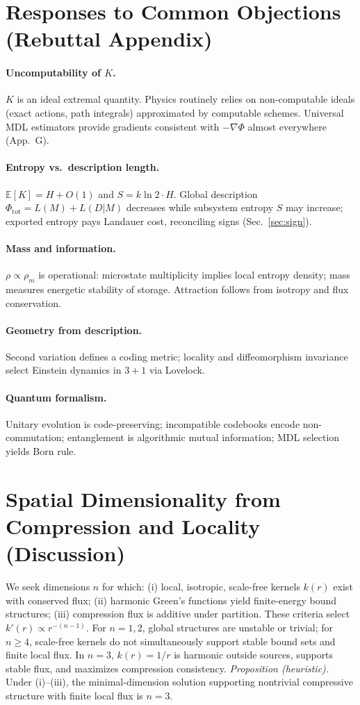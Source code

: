 \documentclass[aps,preprint,onecolumn,longbibliography,nofootinbib]{revtex4-2}
\numberwithin{equation}{section}
\begin{document}
\section{Responses to Common Objections (Rebuttal Appendix)}\label{app:E}
\paragraph*{Uncomputability of $K$.}
$K$ is an ideal extremal quantity. Physics routinely relies on non-computable ideals (exact actions, path integrals) approximated by computable schemes. Universal MDL estimators provide gradients consistent with $-\nabla\Phi$ almost everywhere (App.~G).

\paragraph*{Entropy vs.\ description length.}
$\mathbb{E}[K]=H+O(1)$ and $S=k\ln2\cdot H$. Global description $\Phi_{\text{tot}}=L(M)+L(D|M)$ decreases while subsystem entropy $S$ may increase; exported entropy pays Landauer cost, reconciling signs (Sec.~\ref{sec:sign}).

\paragraph*{Mass and information.}
$\rho\propto\rho_m$ is operational: microstate multiplicity implies local entropy density; mass measures energetic stability of storage. Attraction follows from isotropy and flux conservation.

\paragraph*{Geometry from description.}
Second variation defines a coding metric; locality and diffeomorphism invariance select Einstein dynamics in $3{+}1$ via Lovelock.

\paragraph*{Quantum formalism.}
Unitary evolution is code-preserving; incompatible codebooks encode non-commutation; entanglement is algorithmic mutual information; MDL selection yields Born rule.

\section{Spatial Dimensionality from Compression and Locality (Discussion)}\label{app:F}
We seek dimensions $n$ for which: (i) local, isotropic, scale-free kernels $k(r)$ exist with conserved flux; (ii) harmonic Green’s functions yield finite-energy bound structures; (iii) compression flux is additive under partition. These criteria select $k'(r)\propto r^{-(n-1)}$. For $n=1,2$, global structures are unstable or trivial; for $n\ge 4$, scale-free kernels do not simultaneously support stable bound sets and finite local flux. In $n=3$, $k(r)=1/r$ is harmonic outside sources, supports stable flux, and maximizes compression consistency. \emph{Proposition (heuristic).} Under (i)–(iii), the minimal-dimension solution supporting nontrivial compressive structure with finite local flux is $n=3$.
\end{document}
